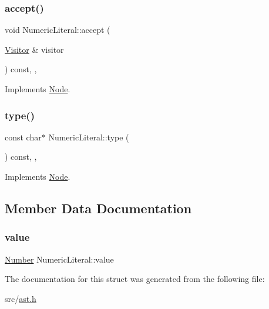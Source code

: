 \subsubsection{\texorpdfstring{accept()}{accept()}}
{\footnotesize\ttfamily void Numeric\+Literal\+::accept (\begin{DoxyParamCaption}\item[{\hyperlink{struct_visitor}{Visitor} \&}]{visitor }\end{DoxyParamCaption}) const\hspace{0.3cm}{\ttfamily [inline]}, {\ttfamily [override]}, {\ttfamily [virtual]}}



Implements \hyperlink{struct_node_a10bd7af968140bbf5fa461298a969c71}{Node}.

\mbox{\label{struct_numeric_literal_a685ec9d2678a8fb5df8b4ec1a580b762}} 
\subsubsection{\texorpdfstring{type()}{type()}}
{\footnotesize\ttfamily const char$\ast$ Numeric\+Literal\+::type (\begin{DoxyParamCaption}{ }\end{DoxyParamCaption}) const\hspace{0.3cm}{\ttfamily [inline]}, {\ttfamily [override]}, {\ttfamily [virtual]}}



Implements \hyperlink{struct_node_a82f29420d0a38efcc370352528e94e9b}{Node}.



\subsection{Member Data Documentation}
\mbox{\label{struct_numeric_literal_a2e20d1fe98e8ee4558f244859be6bd84}} 
\subsubsection{\texorpdfstring{value}{value}}
{\footnotesize\ttfamily \hyperlink{struct_number}{Number} Numeric\+Literal\+::value}



The documentation for this struct was generated from the following file\+:\begin{DoxyCompactItemize}
\item 
src/\hyperlink{ast_8h}{ast.\+h}\end{DoxyCompactItemize}
